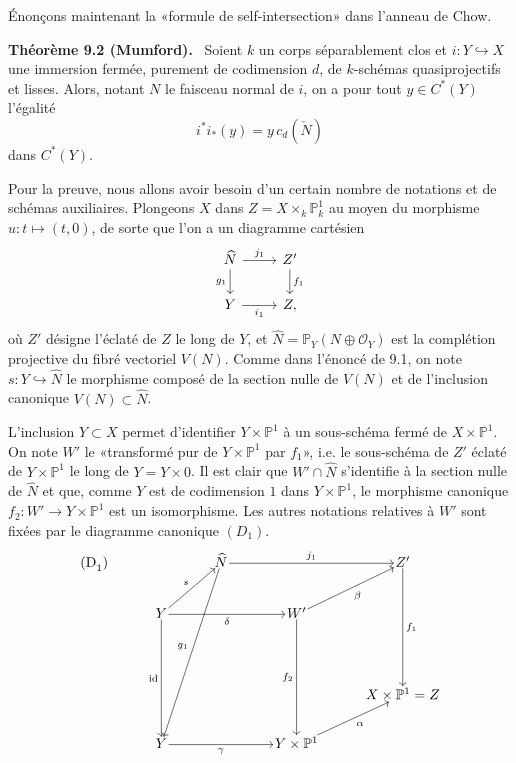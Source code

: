 \documentclass[11pt]{article}
\newenvironment{statement}[1]{\par\medskip\noindent\textbf{#1.}\ }{\par\medskip}
\begin{document}
Énonçons maintenant la «formule de self-intersection» dans l'anneau de Chow.

\begin{statement}{Théorème 9.2 (Mumford)}
Soient $k$ un corps séparablement clos et $i:Y\hookrightarrow X$ une immersion fermée, purement de codimension $d$, de $k$-schémas quasiprojectifs et lisses. Alors, notant $N$ le faisceau normal de $i$, on a pour tout $y\in C^*(Y)$ l'égalité
\[
i^*i_*(y)=y\,c_d(\check N)
\]
dans $C^*(Y)$.
\end{statement}

Pour la preuve, nous allons avoir besoin d'un certain nombre de notations et de schémas auxiliaires. Plongeons $X$ dans $Z=X\times_k\mathbb P^1_k$ au moyen du morphisme $u:t\mapsto(t,0)$, de sorte que l'on a un diagramme cartésien
\[
\begin{tikzcd}
\widehat N \arrow[r,"j_1"] \arrow[d,"g_1"'] & Z' \arrow[d,"f_1"]\\
Y \arrow[r,"i_1"'] & Z ,
\end{tikzcd}
\]
où $Z'$ désigne l'éclaté de $Z$ le long de $Y$, et $\widehat N=\mathbb P_Y(N\oplus\mathcal O_Y)$ est la complétion projective du fibré vectoriel $V(N)$. Comme dans l'énoncé de 9.1, on note $s:Y\hookrightarrow\widehat N$ le morphisme composé de la section nulle de $V(N)$ et de l'inclusion canonique $V(N)\subset\widehat N$.

L'inclusion $Y\subset X$ permet d'identifier $Y\times\mathbb P^1$ à un sous-schéma fermé de $X\times\mathbb P^1$. On note $W'$ le «transformé pur de $Y\times\mathbb P^1$ par $f_1$», i.e. le sous-schéma de $Z'$ éclaté de $Y\times\mathbb P^1$ le long de $Y=Y\times0$. Il est clair que $W'\cap\widehat N$ s'identifie à la section nulle de $\widehat N$ et que, comme $Y$ est de codimension $1$ dans $Y\times\mathbb P^1$, le morphisme canonique $f_2:W'\to Y\times\mathbb P^1$ est un isomorphisme. Les autres notations relatives à $W'$ sont fixées par le diagramme canonique $(D_1)$.
\[
\begin{tikzcd}[column sep=3.2em,row sep=2.4em,cells={nodes={inner sep=1pt}}]
\text{(D}_1\text{)}\arrow[from=1-3,to=5-2,"g_1"']
& & \widehat N \arrow[rr,"j_1"] & & Z' \arrow[ddd,"f_1"] \\
& Y \arrow[ur,"s"] \arrow[rr,"\delta"'] \arrow[ddd,"\mathrm{id}"'] & &
W' \arrow[ur,"\beta"'] \arrow[ddd,"f_2"'] & \\
& & & & \\
& & & & X\times\mathbb P^1=Z \\
& Y \arrow[rr,"\gamma"'] & & Y\times\mathbb P^1 \arrow[ur,"\alpha"'] &
\end{tikzcd}
\]
\end{document}
